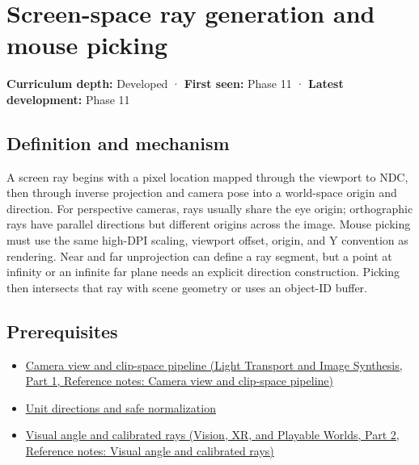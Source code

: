 \hypertarget{appendix-f1a6d43e80d1}{}\label{referencestart:appendix-f1a6d43e80d1}
\section{Screen-space ray generation and mouse picking}\label{appendix-f1a6d43e80d1-screen-space-ray-generation-and-mouse-picking}

\hypertarget{appendix-f1a6d43e80d1-screen-space-ray-generation-and-mouse-picking}{}

\textbf{Curriculum depth:} Developed · \textbf{First seen:} Phase 11 · \textbf{Latest development:} Phase 11

\begin{allmightroledefinition}

\subsection{Definition and mechanism}\label{appendix-f1a6d43e80d1-definition-and-mechanism}

\hypertarget{appendix-f1a6d43e80d1-definition-and-mechanism}{}

A screen ray begins with a pixel location mapped through the viewport to NDC, then through inverse projection and camera pose into a world-space origin and direction. For perspective cameras, rays usually share the eye origin; orthographic rays have parallel directions but different origins across the image. Mouse picking must use the same high-DPI scaling, viewport offset, origin, and Y convention as rendering. Near and far unprojection can define a ray segment, but a point at infinity or an infinite far plane needs an explicit direction construction. Picking then intersects that ray with scene geometry or uses an object-ID buffer.

\end{allmightroledefinition}

\subsection{Prerequisites}\label{appendix-f1a6d43e80d1-prerequisites}

\hypertarget{appendix-f1a6d43e80d1-prerequisites}{}

\begin{itemize}
\tightlist
\item
  \href{../04-Light-Transport-and-Image-Synthesis-P01/main.pdf\#nameddest=appendix-1c07d64f5e70}{Camera view and clip-space pipeline (Light Transport and Image Synthesis, Part 1, Reference notes: Camera view and clip-space pipeline)}
\item
  \hyperref[appendix-f744e41b95b4]{Unit directions and safe normalization}
\item
  \href{../07-Vision-XR-and-Playable-Worlds-P02/main.pdf\#nameddest=appendix-7d356c396d1a}{Visual angle and calibrated rays (Vision, XR, and Playable Worlds, Part 2, Reference notes: Visual angle and calibrated rays)}
\end{itemize}

